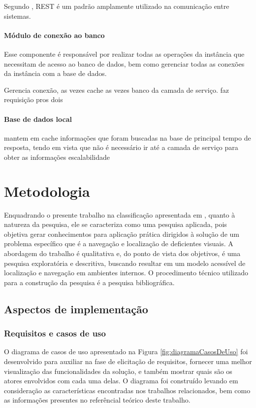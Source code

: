 \documentclass[english,brazilian]{UNISINOSmonografia}
\begin{document}
Segundo , REST é um padrão amplamente utilizado na comunicação entre sistemas.

\subsubsection{Módulo de conexão ao banco}
Esse componente é responsável por realizar todas as operações da instância que necessitam de acesso ao banco de dados, bem como gerenciar todas as conexões da instância com a base de dados.


Gerencia conexão, as vezes cache as vezes banco da camada de serviço.
faz requisição pros dois

\subsubsection{Base de dados local}
mantem em cache informações que foram buscadas na base de principal
tempo de resposta, tendo em vista que não é necessário ir até a camada de serviço para obter as informações
escalabilidade

\chapter{Metodologia}
Enquadrando o presente trabalho na classificação apresentada em , quanto à natureza da pesquisa, ele se caracteriza como uma pesquisa aplicada, pois objetiva gerar conhecimentos para aplicação prática dirigidos à solução de um problema específico que é a navegação e localização de deficientes visuais. A abordagem do trabalho é qualitativa e, do ponto de vista dos objetivos, é uma pesquisa exploratória e descritiva, buscando resultar em um modelo acessível de localização e navegação em ambientes internos. O procedimento técnico utilizado para a construção da pesquisa é a pesquisa bibliográfica.

	\section{Aspectos de implementação}
	
	\subsection{Requisitos e casos de uso}  
O diagrama de casos de uso apresentado na Figura \ref{fig:diagramaCasosDeUso} foi desenvolvido para auxiliar na fase de elicitação de requisitos, fornecer uma melhor visualização das funcionalidades da solução, e também mostrar quais são os atores envolvidos com cada uma delas. O diagrama foi construído levando em consideração as características encontradas nos trabalhos relacionados, bem como as informações presentes no referêncial teórico deste trabalho.
\end{document}
